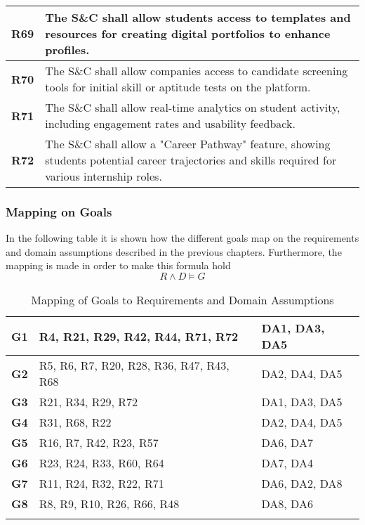 \begin{longtable}{|p{}|p{}|}
\hline
\textbf{R69} & The S\&C shall allow students access to templates and resources for creating digital portfolios to enhance profiles. \\ 
\hline
\textbf{R70} & The S\&C shall allow companies access to candidate screening tools for initial skill or aptitude tests on the platform. \\ 
\hline
\textbf{R71} & The S\&C shall allow real-time analytics on student activity, including engagement rates and usability feedback. \\ 
\hline
\textbf{R72} & The S\&C shall allow a "Career Pathway" feature, showing students potential career trajectories and skills required for various internship roles. \\ 
\hline
\end{longtable}
\newpage
\subsubsection{Mapping on Goals}
In the following table it is shown how the different goals map on the requirements and domain assumptions described in the previous chapters. Furthermore, the mapping is made in order to make this formula hold 
\begin{equation}
R \land D \models G
\end{equation}
\begin{longtable}{|p{3cm}|p{5cm}|p{5cm}|}
\hline

\textbf{G1} & R4, R21, R29, R42, R44, R71, R72 & DA1, DA3, DA5 \\ 
\hline
\textbf{G2} & R5, R6, R7, R20, R28, R36, R47, R43, R68 & DA2, DA4, DA5 \\ 
\hline
\textbf{G3} & R21, R34, R29, R72 & DA1, DA3, DA5 \\ 
\hline
\textbf{G4} & R31, R68, R22 & DA2, DA4, DA5 \\ 
\hline
\textbf{G5} & R16, R7, R42, R23, R57 & DA6, DA7 \\ 
\hline
\textbf{G6} & R23, R24, R33, R60, R64 & DA7, DA4 \\ 
\hline
\textbf{G7} & R11, R24, R32, R22, R71 & DA6, DA2, DA8 \\ 
\hline
\textbf{G8} & R8, R9, R10, R26, R66, R48 & DA8, DA6 \\ 
\hline

\caption{Mapping of Goals to Requirements and Domain Assumptions}
\end{longtable}
